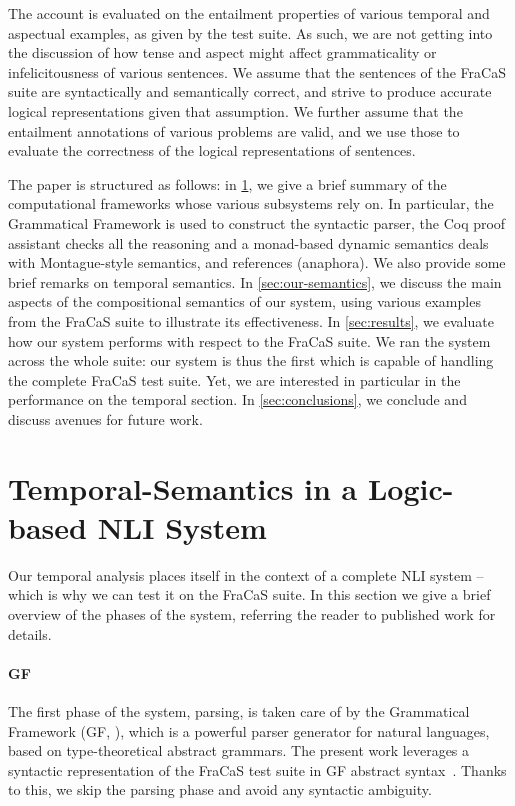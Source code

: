 \documentclass[a4paper,11pt]{article}
\begin{document}
The account is evaluated on the entailment properties of various
temporal and aspectual examples, as given by the test suite. As such,
we are not getting into the discussion of how tense and aspect might
affect grammaticality or infelicitousness of various sentences.
We assume that the sentences of the FraCaS suite are syntactically and
semantically correct, and strive to produce accurate logical
representations given that assumption. We further assume that the
entailment annotations of various problems are valid, and we use those
to evaluate the correctness of the logical representations of
sentences.

The paper is structured as follows: in \cref{sec:background}, we give
a brief summary of the computational frameworks whose various
subsystems rely on. In particular, the Grammatical Framework is used
to construct the syntactic parser, the Coq proof assistant checks all
the reasoning and a monad-based dynamic semantics deals with
Montague-style semantics, and references (anaphora).  We also provide
some brief remarks on temporal semantics. In \cref{sec:our-semantics},
we discuss the main aspects of the compositional semantics of our
system, using various examples from the FraCaS suite to illustrate its
effectiveness. In \cref{sec:results}, we evaluate how our system
performs with respect to the FraCaS suite. We ran the system across
the whole suite: our system is thus the first which is capable of
handling the complete FraCaS test suite.  Yet, we are interested in
particular in the performance on the temporal section. In
\cref{sec:conclusions}, we conclude and discuss avenues for future
work.


\section{Temporal-Semantics in a Logic-based NLI System}
\label{sec:background}

Our temporal analysis places itself in the context of a complete NLI
system -- which is why we can test it on the FraCaS suite. In this
section we give a brief overview of the phases of the system,
referring the reader to published work for details.

\paragraph{GF}
The first phase of the system, parsing, is taken care of by the 
Grammatical Framework (GF, \citet{ranta_grammatical_2004}), which is a
powerful parser generator for natural languages, based on
type-theoretical abstract grammars.  The present work leverages a
syntactic representation of the FraCaS test suite in GF abstract
syntax~\citep{Ljunglof:2012}. Thanks to this, we skip the parsing
phase and avoid any syntactic ambiguity.
\end{document}
